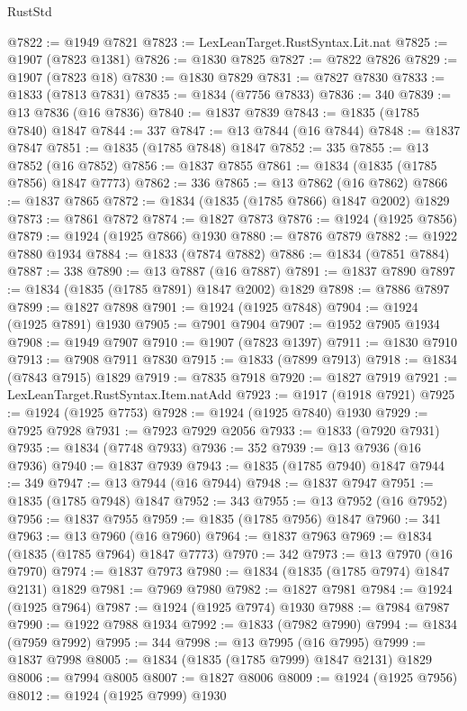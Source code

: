\begin{lexlean}{RustStd}
\begin{coremodule}
{\begin{coremodule}
{{{{{@7822 := @1949 @7821
@7823 := LexLeanTarget.RustSyntax.Lit.nat
@7825 := @1907 (@7823 @1381)
@7826 := @1830 @7825
@7827 := @7822 @7826
@7829 := @1907 (@7823 @18)
@7830 := @1830 @7829
@7831 := @7827 @7830
@7833 := @1833 (@7813 @7831)
@7835 := @1834 (@7756 @7833)
@7836 := 340
@7839 := @13 @7836 (@16 @7836)
@7840 := @1837 @7839
@7843 := @1835 (@1785 @7840) @1847
@7844 := 337
@7847 := @13 @7844 (@16 @7844)
@7848 := @1837 @7847
@7851 := @1835 (@1785 @7848) @1847
@7852 := 335
@7855 := @13 @7852 (@16 @7852)
@7856 := @1837 @7855
@7861 := @1834 (@1835 (@1785 @7856) @1847 @7773)
@7862 := 336
@7865 := @13 @7862 (@16 @7862)
@7866 := @1837 @7865
@7872 := @1834 (@1835 (@1785 @7866) @1847 @2002) @1829
@7873 := @7861 @7872
@7874 := @1827 @7873
@7876 := @1924 (@1925 @7856)
@7879 := @1924 (@1925 @7866) @1930
@7880 := @7876 @7879
@7882 := @1922 @7880 @1934
@7884 := @1833 (@7874 @7882)
@7886 := @1834 (@7851 @7884)
@7887 := 338
@7890 := @13 @7887 (@16 @7887)
@7891 := @1837 @7890
@7897 := @1834 (@1835 (@1785 @7891) @1847 @2002) @1829
@7898 := @7886 @7897
@7899 := @1827 @7898
@7901 := @1924 (@1925 @7848)
@7904 := @1924 (@1925 @7891) @1930
@7905 := @7901 @7904
@7907 := @1952 @7905 @1934
@7908 := @1949 @7907
@7910 := @1907 (@7823 @1397)
@7911 := @1830 @7910
@7913 := @7908 @7911 @7830
@7915 := @1833 (@7899 @7913)
@7918 := @1834 (@7843 @7915) @1829
@7919 := @7835 @7918
@7920 := @1827 @7919
@7921 := LexLeanTarget.RustSyntax.Item.natAdd
@7923 := @1917 (@1918 @7921)
@7925 := @1924 (@1925 @7753)
@7928 := @1924 (@1925 @7840) @1930
@7929 := @7925 @7928
@7931 := @7923 @7929 @2056
@7933 := @1833 (@7920 @7931)
@7935 := @1834 (@7748 @7933)
@7936 := 352
@7939 := @13 @7936 (@16 @7936)
@7940 := @1837 @7939
@7943 := @1835 (@1785 @7940) @1847
@7944 := 349
@7947 := @13 @7944 (@16 @7944)
@7948 := @1837 @7947
@7951 := @1835 (@1785 @7948) @1847
@7952 := 343
@7955 := @13 @7952 (@16 @7952)
@7956 := @1837 @7955
@7959 := @1835 (@1785 @7956) @1847
@7960 := 341
@7963 := @13 @7960 (@16 @7960)
@7964 := @1837 @7963
@7969 := @1834 (@1835 (@1785 @7964) @1847 @7773)
@7970 := 342
@7973 := @13 @7970 (@16 @7970)
@7974 := @1837 @7973
@7980 := @1834 (@1835 (@1785 @7974) @1847 @2131) @1829
@7981 := @7969 @7980
@7982 := @1827 @7981
@7984 := @1924 (@1925 @7964)
@7987 := @1924 (@1925 @7974) @1930
@7988 := @7984 @7987
@7990 := @1922 @7988 @1934
@7992 := @1833 (@7982 @7990)
@7994 := @1834 (@7959 @7992)
@7995 := 344
@7998 := @13 @7995 (@16 @7995)
@7999 := @1837 @7998
@8005 := @1834 (@1835 (@1785 @7999) @1847 @2131) @1829
@8006 := @7994 @8005
@8007 := @1827 @8006
@8009 := @1924 (@1925 @7956)
@8012 := @1924 (@1925 @7999) @1930
}}}}}
\end{coremodule}}
\end{coremodule}
\end{lexlean}
